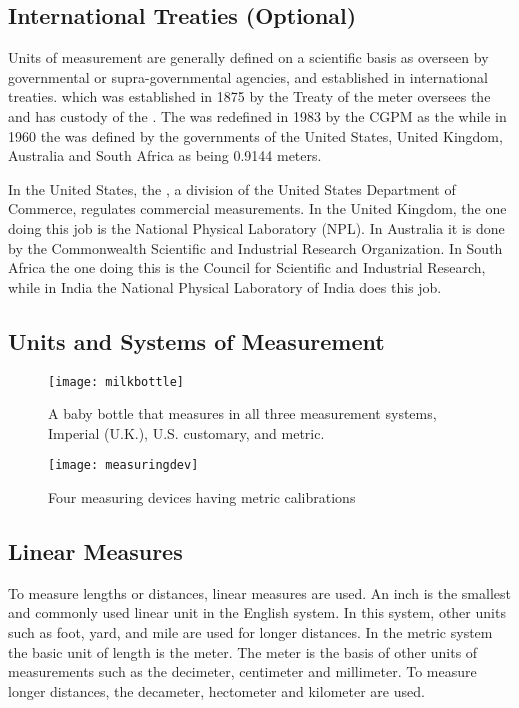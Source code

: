 \subsection*{International Treaties (Optional)}
Units of measurement are generally defined on a scientific basis as overseen by
governmental or supra-governmental agencies, and established in international treaties.
 which was established in 1875
by the Treaty of the meter oversees the  and has custody
of the . The  was redefined in 1983 by the CGPM as
the  while in 1960 the
 was defined by the governments of the United States, United Kingdom,
Australia and South Africa as being  0.9144 meters.

In the United States, the , a
division of the United States Department of Commerce, regulates commercial
measurements. In the United Kingdom, the one doing this job is the National Physical
Laboratory (NPL). In Australia it is done by the Commonwealth Scientific and Industrial
Research Organization. In South Africa the one doing this is the Council for Scientific and
Industrial Research, while in India the National Physical Laboratory of India does this job.

\subsection*{Units and Systems of Measurement}
\begin{figure}[h]
\centering
\texttt{[image: milkbottle]}
\caption{A baby bottle that measures in all three measurement systems, Imperial (U.K.), U.S. customary, and
metric.}
\label{fig3:1}
\end{figure}

\begin{figure}[h]
\centering
\texttt{[image: measuringdev]}
\caption{Four measuring devices having metric calibrations}
\label{fig3:2}
\end{figure}

\subsection*{Linear Measures}
To measure lengths or distances, linear measures are used. An inch is the smallest
and commonly used linear unit in the English system. In this system, other units such as foot,
yard, and mile are used for longer distances. In the metric system the basic unit of length is
the meter. The meter is the basis of other units of measurements such as the decimeter,
centimeter and millimeter. To measure longer distances, the decameter, hectometer and
kilometer are used.

